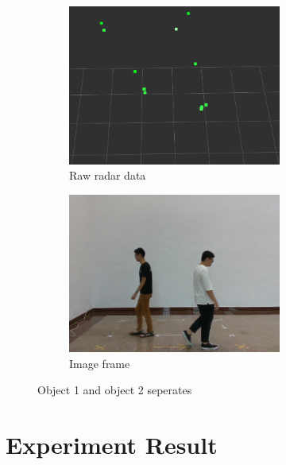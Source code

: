 \begin{figure}[!htb]
    \centering
    \begin{subfigure}{0.3\linewidth}
        \includegraphics[width=7cm]{Figures/after_conceal_radar.png}
        \caption{Raw radar data}
        \label{subfig:after_conceal_radar_fig}
    \end{subfigure}
    \hspace{0.15\textwidth}
    \begin{subfigure}{0.3\linewidth}
        \includegraphics[width=7cm]{Figures/after_conceal_image.png}
        \caption{Image frame}
        \label{subfig:after_conceal_image_fig}
    \end{subfigure}

    \caption{Object 1 and object 2 seperates}
    \label{fig:after_conceal_fig}
\end{figure}





\newpage 
\section{Experiment Result}\label{sec:3-exp_result}
